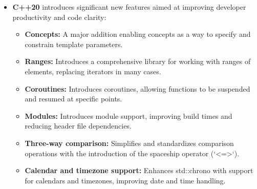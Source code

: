 \begin{itemize}
\item \textbf{C++20} introduces significant new features aimed at improving developer productivity and code clarity:
\begin{itemize}
    \item \textbf{Concepts:} A major addition enabling concepts as a way to specify and constrain template parameters.
    \item \textbf{Ranges:} Introduces a comprehensive library for working with ranges of elements, replacing iterators in many cases.
    \item \textbf{Coroutines:} Introduces coroutines, allowing functions to be suspended and resumed at specific points.
    \item \textbf{Modules:} Introduces module support, improving build times and reducing header file dependencies.
    \item \textbf{Three-way comparison:} Simplifies and standardizes comparison operations with the introduction of the spaceship operator (`<=>`).
    \item \textbf{Calendar and timezone support:} Enhances std::chrono with support for calendars and timezones, improving date and time handling.
\end{itemize}
\end{itemize}

